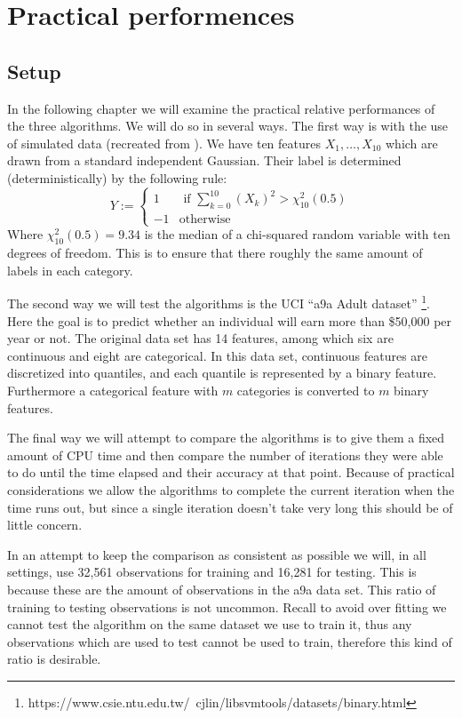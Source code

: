 
\chapter{Practical performences}
\label{chap:pracPerf}
\section{Setup}
\label{sec:Setup}
In the following chapter we will examine the practical relative performances of the three algorithms. We will do so in several ways. The first way is with the use of simulated data (recreated from \cite{Hastie2009}). We have ten features $X_1,\ldots,X_{10}$ which are drawn from a standard independent Gaussian. Their label is determined (deterministically) by the following rule: $$Y:=\begin{cases}
1 & \text{ if } \sum_{k=0}^{10} (X_k)^2 > \chi_{10}^2(0.5)\\
-1 & \text{otherwise}
\end{cases}$$ Where $\chi_{10}^2(0.5)=9.34$ is the median of a chi-squared random variable with ten degrees of freedom. This is to ensure that there roughly the same amount of labels in each category. 

\par The second way we will test the algorithms is the UCI ``a9a Adult dataset'' \footnote{https://www.csie.ntu.edu.tw/~cjlin/libsvmtools/datasets/binary.html}. Here the goal is to predict whether an individual will earn more than \$50,000 per year or not. The original data set has 14 features, among which six are continuous and eight are categorical. In this data set, continuous features are discretized into quantiles, and each quantile is represented by a binary feature. Furthermore a categorical feature with $m$ categories is converted to $m$ binary features. 

\par The final way we will attempt to compare the algorithms is to give them a fixed amount of CPU time and then compare the number of iterations they were able to do until the time elapsed and their accuracy at that point. Because of practical considerations we allow the algorithms to complete the current iteration when the time runs out, but since a single iteration doesn't take very long this should be of little concern.

\par In an attempt to keep the comparison as consistent as possible we will, in all settings, use 32,561 observations for training and 16,281 for testing. This is because these are the amount of observations in the a9a data set. This ratio of training to testing observations is not uncommon. Recall to avoid over fitting we cannot test the algorithm on the same dataset we use to train it, thus any observations which are used to test cannot be used to train, therefore this kind of ratio is desirable.

